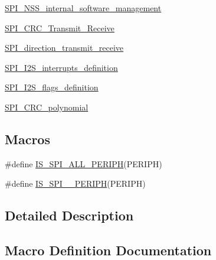 \begin{DoxyCompactItemize}
\item 
\mbox{\hyperlink{group___s_p_i___n_s_s__internal__software__management}{S\+P\+I\+\_\+\+N\+S\+S\+\_\+internal\+\_\+software\+\_\+management}}
\item 
\mbox{\hyperlink{group___s_p_i___c_r_c___transmit___receive}{S\+P\+I\+\_\+\+C\+R\+C\+\_\+\+Transmit\+\_\+\+Receive}}
\item 
\mbox{\hyperlink{group___s_p_i__direction__transmit__receive}{S\+P\+I\+\_\+direction\+\_\+transmit\+\_\+receive}}
\item 
\mbox{\hyperlink{group___s_p_i___i2_s__interrupts__definition}{S\+P\+I\+\_\+\+I2\+S\+\_\+interrupts\+\_\+definition}}
\item 
\mbox{\hyperlink{group___s_p_i___i2_s__flags__definition}{S\+P\+I\+\_\+\+I2\+S\+\_\+flags\+\_\+definition}}
\item 
\mbox{\hyperlink{group___s_p_i___c_r_c__polynomial}{S\+P\+I\+\_\+\+C\+R\+C\+\_\+polynomial}}
\end{DoxyCompactItemize}
\subsection*{Macros}
\begin{DoxyCompactItemize}
\item 
\#define \mbox{\hyperlink{group___s_p_i___exported___constants_gaf54f84a30a5914b54dbfdc186720d0ba}{I\+S\+\_\+\+S\+P\+I\+\_\+\+A\+L\+L\+\_\+\+P\+E\+R\+I\+PH}}(P\+E\+R\+I\+PH)
\item 
\#define \mbox{\hyperlink{group___s_p_i___exported___constants_gae2222c673a036497587b8791f89428d0}{I\+S\+\_\+\+S\+P\+I\+\_\+\_\+\+P\+E\+R\+I\+PH}}(P\+E\+R\+I\+PH)
\end{DoxyCompactItemize}


\subsection{Detailed Description}


\subsection{Macro Definition Documentation}
\mbox{\label{group___s_p_i___exported___constants_gae2222c673a036497587b8791f89428d0}} 
